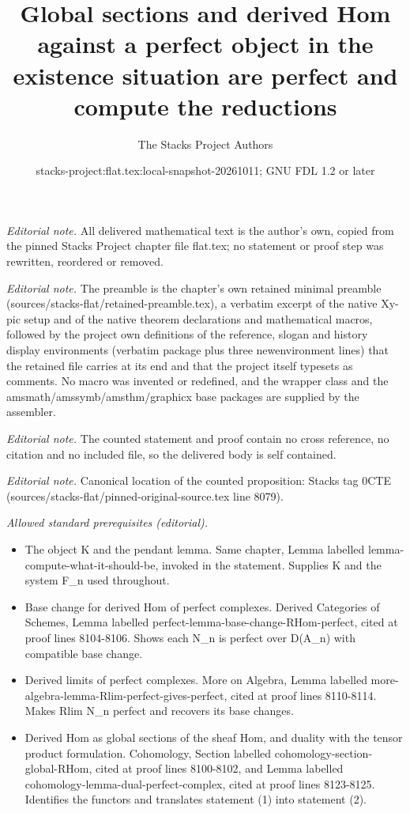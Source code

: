 \documentclass[10pt,a4paper]{amsart}
\title{Global sections and derived Hom against a perfect object in the existence situation are perfect and compute the reductions}
\author{The Stacks Project Authors}
\date{stacks-project:flat.tex:local-snapshot-20261011; GNU FDL 1.2 or later}
\theoremstyle{plain}
\theoremstyle{definition}
\theoremstyle{remark}
\numberwithin{equation}{subsection}
\begin{document}
\maketitle
\noindent\textit{Editorial note.} All delivered mathematical text is the author's own, copied from the pinned Stacks Project chapter file flat.tex; no statement or proof step was rewritten, reordered or removed.\par\medskip
\noindent\textit{Editorial note.} The preamble is the chapter's own retained minimal preamble (sources/stacks-flat/retained-preamble.tex), a verbatim excerpt of the native Xy-pic setup and of the native theorem declarations and mathematical macros, followed by the project own definitions of the reference, slogan and history display environments (verbatim package plus three newenvironment lines) that the retained file carries at its end and that the project itself typesets as comments. No macro was invented or redefined, and the wrapper class and the amsmath/amssymb/amsthm/graphicx base packages are supplied by the assembler.\par\medskip
\noindent\textit{Editorial note.} The counted statement and proof contain no cross reference, no citation and no included file, so the delivered body is self contained.\par\medskip
\noindent\textit{Editorial note.} Canonical location of the counted proposition: Stacks tag 0CTE (sources/stacks-flat/pinned-original-source.tex line 8079).\par\medskip
\noindent\textit{Allowed standard prerequisites (editorial).}\begin{itemize}
\item The object K and the pendant lemma. Same chapter, Lemma labelled lemma-compute-what-it-should-be, invoked in the statement. Supplies K and the system F\_n used throughout.
\item Base change for derived Hom of perfect complexes. Derived Categories of Schemes, Lemma labelled perfect-lemma-base-change-RHom-perfect, cited at proof lines 8104-8106. Shows each N\_n is perfect over D(A\_n) with compatible base change.
\item Derived limits of perfect complexes. More on Algebra, Lemma labelled more-algebra-lemma-Rlim-perfect-gives-perfect, cited at proof lines 8110-8114. Makes Rlim N\_n perfect and recovers its base changes.
\item Derived Hom as global sections of the sheaf Hom, and duality with the tensor product formulation. Cohomology, Section labelled cohomology-section-global-RHom, cited at proof lines 8100-8102, and Lemma labelled cohomology-lemma-dual-perfect-complex, cited at proof lines 8123-8125. Identifies the functors and translates statement (1) into statement (2).
\end{itemize}\medskip
\end{document}
